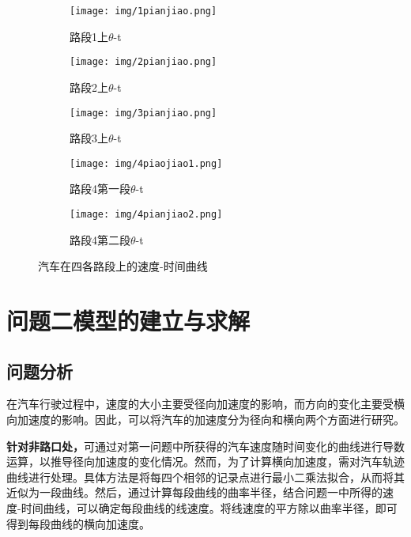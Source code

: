 \documentclass[withoutpreface,bwprint]{cumcmthesis} %
\begin{document}
\begin{figure}[htbp]
	\centering
	\begin{subfigure}{0.3\linewidth}
		\centering
		\texttt{[image: img/1pianjiao.png]}
   \captionsetup{font=small, position=below}
		\caption{路段1上$\theta$-t}
	\end{subfigure}
	\centering
	\begin{subfigure}{0.325\linewidth}
		\centering
		\texttt{[image: img/2pianjiao.png]}
   \captionsetup{font=small, position=below}
		\caption{路段2上$\theta$-t}
		
	\end{subfigure}
	\centering
	\begin{subfigure}{0.325\linewidth}
		\centering
		\texttt{[image: img/3pianjiao.png]}
   \captionsetup{font=small, position=below}
		\caption{路段3上$\theta$-t}
		
	\end{subfigure}
	\quad
\centering
	\begin{subfigure}{0.325\linewidth}
		\centering
		\texttt{[image: img/4piaojiao1.png]}
   \captionsetup{font=small, position=below}
		\caption{路段4第一段$\theta$-t}
		
	\end{subfigure}
\centering
	\begin{subfigure}{0.325\linewidth}
		\centering
		\texttt{[image: img/4pianjiao2.png]}
   \captionsetup{font=small, position=below}
		\caption{路段4第二段$\theta$-t}
		
	\end{subfigure}
  \captionsetup{font=small, position=below}
\caption{汽车在四各路段上的速度-时间曲线}
\end{figure}



\newpage
\section{问题二模型的建立与求解}
\subsection{问题分析}
在汽车行驶过程中，速度的大小主要受径向加速度的影响，而方向的变化主要受横向加速度的影响。因此，可以将汽车的加速度分为径向和横向两个方面进行研究。

\textbf{针对非路口处，}可通过对第一问题中所获得的汽车速度随时间变化的曲线进行导数运算，以推导径向加速度的变化情况。然而，为了计算横向加速度，需对汽车轨迹曲线进行处理。具体方法是将每四个相邻的记录点进行最小二乘法拟合，从而将其近似为一段曲线。然后，通过计算每段曲线的曲率半径，结合问题一中所得的速度-时间曲线，可以确定每段曲线的线速度。将线速度的平方除以曲率半径，即可得到每段曲线的横向加速度。
\end{document}
